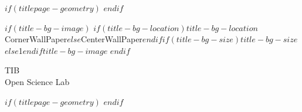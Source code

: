 


$if(titlepage-geometry)$
$endif$


$if(title-bg-image)$
  \This$if(title-bg-location)$$title-bg-location$CornerWallPaper$else$CenterWallPaper$endif${$if(title-bg-size)$$title-bg-size$$else$1$endif$}{$title-bg-image$}  
$endif$

\bigbreak





\vfill

\vspace{1\baselineskip} 

\begin{tcolorbox}
\centering

{
  TIB\\
  Open Science Lab
}
\end{tcolorbox}

$if(titlepage-geometry)$
  \restoregeometry
$endif$
